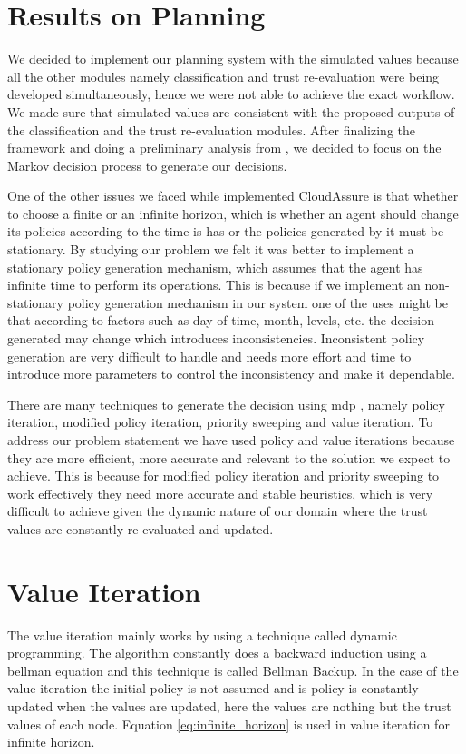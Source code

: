 \section{Results on Planning}
We decided to implement our planning system with the
simulated values because all the other modules namely classification and trust
re-evaluation were being developed simultaneously, hence we were not able to
achieve the exact workflow. We made sure that simulated values are consistent
with the proposed outputs of the classification and the trust re-evaluation
modules. After finalizing the framework and doing a preliminary analysis from
\autocite{Norvig2012}, we decided to focus on the Markov decision process to generate our
decisions.  

One of the other issues we faced while implemented CloudAssure is that whether to choose a finite or an infinite horizon, which is
whether an agent should change its policies according to the time is has or the
policies generated by it must be stationary. By studying our problem we felt it
was better to implement a stationary policy generation mechanism, which assumes
that the agent has infinite time to perform its operations. This is because if
we implement an non-stationary policy generation mechanism in our system one of
the uses might be that according to factors such as day of time, month, levels,
etc. the decision generated may change which introduces inconsistencies.
Inconsistent policy generation are very difficult to handle and needs more
effort and time to introduce more parameters to control the inconsistency and
make it dependable.  

There are many techniques to generate the decision using
\gls{mdp} \autocite{Wikipedia2013}, namely policy iteration, modified policy iteration, priority sweeping
and value iteration. To address our problem statement we have used policy and
value iterations because they are more efficient, more accurate and relevant to
the solution we expect to achieve. This is because for modified policy iteration
and priority sweeping to work effectively they need more accurate and stable
heuristics, which is very difficult to achieve given the dynamic nature of our
domain where the trust values are constantly re-evaluated and updated. 

\section{Value Iteration}
The value iteration mainly works by using a technique called dynamic
programming. The algorithm constantly does a backward induction using a bellman
equation \autocite{Wikipedia2013} and this technique is called Bellman Backup. In the case of the
value iteration the initial policy is not assumed and is policy is constantly
updated when the values are updated, here the values are nothing but the trust
values of each node.  Equation \ref{eq:infinite_horizon} is used in value iteration for infinite
horizon.

